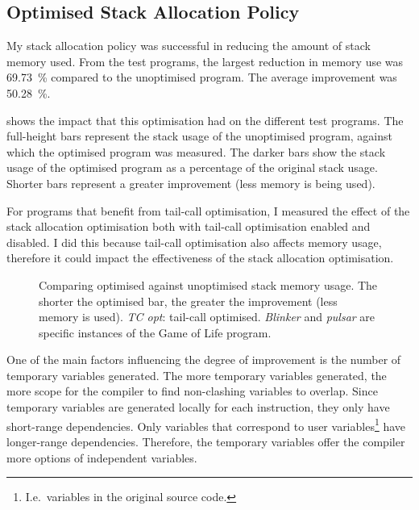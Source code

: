 \documentclass[00-main.tex]{subfiles}
\begin{document}
\subsection{Optimised Stack Allocation Policy}\label{sec:eval:optimised stack allocation}

My stack allocation policy was successful in reducing the amount of stack memory used.
From the test programs, the largest reduction in memory use was \SI{69.73}{\percent} compared to the unoptimised program.
The average improvement was \SI{50.28}{\percent}.

 shows the impact that this optimisation had on the different test programs.
The full-height bars represent the stack usage of the unoptimised program, against which the optimised program was measured.
The darker bars show the stack usage of the optimised program as a percentage of the original stack usage.
Shorter bars represent a greater improvement (less memory is being used).

For programs that benefit from tail-call optimisation, I measured the effect of the stack allocation optimisation both with tail-call optimisation enabled and disabled.
I did this because tail-call optimisation also affects memory usage, therefore it could impact the effectiveness of the stack allocation optimisation.

\begin{figure}[t]
  \centering
  \caption{Comparing optimised against unoptimised stack memory usage. The shorter the optimised bar, the greater the improvement (less memory is used). \emph{TC opt}: tail-call optimised. \emph{Blinker} and \emph{pulsar} are specific instances of the Game of Life program.}%
  \label{fig:comparing stack usage optimisation across programs}
\end{figure}

One of the main factors influencing the degree of improvement is the number of temporary variables generated.
The more temporary variables generated, the more scope for the compiler to find non-clashing variables to overlap.
Since temporary variables are generated locally for each instruction, they only have short-range dependencies.
Only variables that correspond to user variables\footnote{I.e.~variables in the original source code.} have longer-range dependencies.
Therefore, the temporary variables offer the compiler more options of independent variables.
\end{document}
